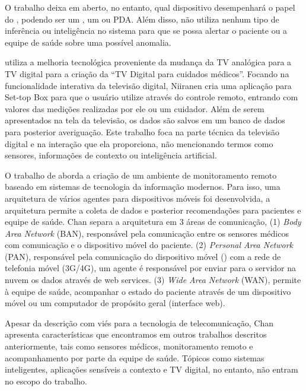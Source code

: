 O trabalho deixa em aberto, no entanto, qual dispositivo desempenhará o papel
do \gateway[], podendo ser um \tablet[], um \smartphone[] ou PDA. Além disso, não
utiliza nenhum tipo de inferência ou inteligência no sistema para que se possa
alertar o paciente ou a equipe de saúde sobre uma possível anomalia.

 utiliza a melhoria tecnológica proveniente da
mudança da TV analógica para a TV digital para a criação da ``TV Digital para
cuidados médicos''. Focando na funcionalidade interativa da televisão digital,
Niiranen cria uma aplicação para Set-top Box para que o usuário utilize através
do controle remoto, entrando com valores das medições realizadas por ele ou um
cuidador. Além de serem apresentados na tela da televisão, os dados são salvos
em um banco de dados para posterior averiguação. Este trabalho foca na parte
técnica da televisão digital e na interação que ela proporciona, não
mencionando termos como sensores, informações de contexto ou inteligência
artificial.

O trabalho de  aborda a criação de um ambiente de
monitoramento remoto baseado em sistemas de tecnologia da informação modernos.
Para isso, uma arquitetura de vários agentes para dispositivos móveis foi
desenvolvida, a arquitetura permite a coleta de dados e posterior recomendações
para pacientes e equipe de saúde. Chan separa a arquitetura em 3 áreas de
comunicação, (1) \textit{Body Area Network} (BAN), responsável pela comunicação
entre os sensores médicos com comunicação \bluetooth[] e o dispositivo móvel do
paciente.  (2) \textit{Personal Area Network} (PAN), responsável pela
comunicação do dispositivo móvel (\smartphone) com a rede de telefonia móvel
(3G/4G), um agente é responsável por enviar para o servidor na nuvem os dados
através de web services. (3) \textit{Wide Area Network} (WAN), permite à equipe
de saúde, acompanhar o estado do paciente através de um dispositivo móvel ou um
computador de propósito geral (interface web).

Apesar da descrição com viés para a tecnologia de telecomunicação, Chan
apresenta características que encontramos em outros trabalhos descritos
anteriormente, tais como sensores médicos, monitoramento remoto e
acompanhamento por parte da equipe de saúde. Tópicos como sistemas
inteligentes, aplicações sensíveis a contexto e TV digital, no entanto, não
entram no escopo do trabalho.
